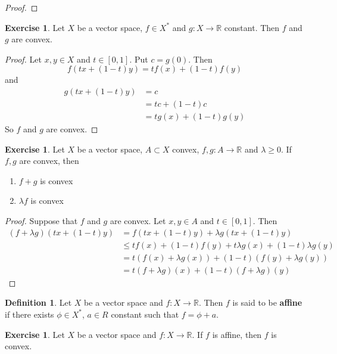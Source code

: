 \documentclass[12pt]{amsart}
\theoremstyle{definition}
\newtheorem{defn}[definition]{Definition}
\newtheorem{ex}[definition]{Exercise}
\newcommand{\lam}{\lambda}
\newcommand{\R}{\mathbb{R}}
\newcommand{\ui}{[0,1]}
\begin{document}
	\begin{proof}
	
	\end{proof}
	
	\begin{ex}
	Let $X$ be a vector space, $f \in X^*$ and $g: X \rightarrow \R$ constant. Then $f$ and $g$ are convex. 
	\end{ex}
	
	\begin{proof}
		Let $x, y \in X$ and $t \in \ui$. Put $c = g(0)$. Then $$f(tx + (1-t)y) = tf(x) + (1-t)f(y)$$ and 
		\begin{align*}
		g(tx + (1-t)y) 
		&= c\\ 
		&= tc + (1-t)c \\
		&= tg(x) + (1-t)g(y)
		\end{align*}
		So $f$ and $g$ are convex.
	\end{proof}		
	
	\begin{ex}
	Let $X$ be a vector space, $A \subset X$ convex, $f,g:A \rightarrow \R$ and $\lam \geq 0$. If $f,g$ are convex, then 
	\begin{enumerate}
	\item $f + g$ is convex 
	\item $\lam f$ is convex
	\end{enumerate}
	\end{ex}
	
	\begin{proof}
	Suppose that $f$ and $g$ are convex. Let $x,y \in A$ and $t \in [0,1]$. Then 
	\begin{align*}
	(f + \lam g)(tx + (1-t)y) 
	&= f(tx + (1-t)y) + \lam g(tx + (1-t)y) \\
	& \leq tf(x) + (1-t)f(y) +  t \lam g(x) + (1-t)\lam g(y) \\
	&= t(f(x) + \lam g(x)) + (1-t)(f(y) + \lam g(y))\\
	& = t(f + \lam g)(x) + (1-t)(f + \lam g)(y)
\end{align*}		 
	\end{proof}
	
	
	\begin{defn}
	Let $X$ be a vector space and $f: X \rightarrow \R$. Then $f$ is said to be \textbf{affine} if there exists $\phi \in X^*$, $a \in R$ constant such that $f = \phi + a$.\\
	\end{defn}
	
	\begin{ex}
	Let $X$ be a vector space and $f: X \rightarrow \R$. If $f$ is affine, then $f$ is convex.
	\end{ex}
	
\end{document}
